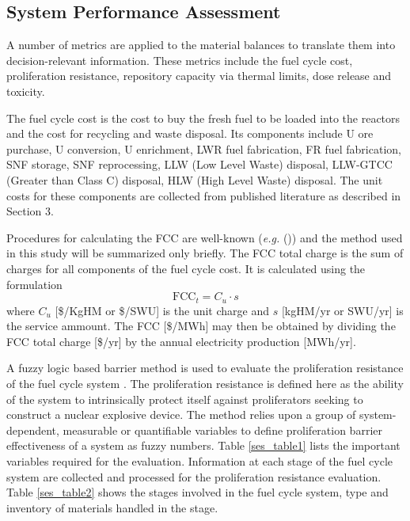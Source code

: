 \subsection{System Performance Assessment}
\label{ses_sec:spa}
A number of metrics are applied to the material balances to translate
them into decision-relevant information.  These metrics include the fuel
cycle cost, proliferation resistance, repository capacity via thermal
limits, dose release and toxicity.

The fuel cycle cost is the cost to buy the fresh fuel to be loaded into
the reactors and the cost for recycling and waste disposal.  Its
components include U ore purchase, U conversion, U enrichment, LWR fuel
fabrication, FR fuel fabrication, SNF storage, SNF reprocessing, LLW
(Low Level Waste) disposal, LLW-GTCC (Greater than Class C) disposal,
HLW (High Level Waste) disposal. The unit costs for these components are
collected from published literature as described in Section 3. 

Procedures for calculating the FCC are well-known (\emph{e.g.} ()) and the
method used in this study will be summarized only briefly.  The FCC
total charge is the sum of charges for all components of the fuel cycle
cost.  It is calculated using the formulation
\begin{equation}
\label{ses_FCC}
\mbox{FCC}_t = C_u \cdot s
\end{equation}
where $C_u$ [\$/KgHM or \$/SWU] is the unit charge and $s$ [kgHM/yr or SWU/yr] 
is the service ammount. The FCC [\$/MWh] may then be obtained by dividing the 
FCC total charge [\$/yr] by the annual electricity production [MWh/yr].

A fuzzy logic based barrier method is used to evaluate the
proliferation resistance of the fuel cycle system \cite{}. The proliferation
resistance is defined here as the ability of the system to intrinsically
protect itself against proliferators seeking to construct a nuclear
explosive device. The method relies upon a group of system-dependent,
measurable or quantifiable variables to define proliferation barrier
effectiveness of a system as fuzzy numbers. 
Table \ref{ses_table1} lists the important variables required for
the evaluation. Information at each stage of the fuel cycle system are
collected and processed for the proliferation resistance evaluation.
Table \ref{ses_table2} shows the stages involved in the fuel cycle system, type and
inventory of materials handled in the stage.


